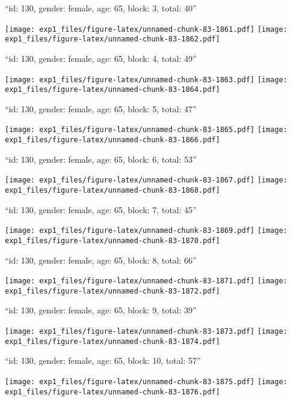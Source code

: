 \documentclass[11pt,,]{article}
\begin{document}
\newpage
[1] 

``id: 130, gender: female, age: 65, block: 3, total: 40''

\texttt{[image: exp1\_files/figure-latex/unnamed-chunk-83-1861.pdf]}
\texttt{[image: exp1\_files/figure-latex/unnamed-chunk-83-1862.pdf]}

\newpage
[1] 

``id: 130, gender: female, age: 65, block: 4, total: 49''

\texttt{[image: exp1\_files/figure-latex/unnamed-chunk-83-1863.pdf]}
\texttt{[image: exp1\_files/figure-latex/unnamed-chunk-83-1864.pdf]}

\newpage
[1] 

``id: 130, gender: female, age: 65, block: 5, total: 47''

\texttt{[image: exp1\_files/figure-latex/unnamed-chunk-83-1865.pdf]}
\texttt{[image: exp1\_files/figure-latex/unnamed-chunk-83-1866.pdf]}

\newpage
[1] 

``id: 130, gender: female, age: 65, block: 6, total: 53''

\texttt{[image: exp1\_files/figure-latex/unnamed-chunk-83-1867.pdf]}
\texttt{[image: exp1\_files/figure-latex/unnamed-chunk-83-1868.pdf]}

\newpage
[1] 

``id: 130, gender: female, age: 65, block: 7, total: 45''

\texttt{[image: exp1\_files/figure-latex/unnamed-chunk-83-1869.pdf]}
\texttt{[image: exp1\_files/figure-latex/unnamed-chunk-83-1870.pdf]}

\newpage
[1] 

``id: 130, gender: female, age: 65, block: 8, total: 66''

\texttt{[image: exp1\_files/figure-latex/unnamed-chunk-83-1871.pdf]}
\texttt{[image: exp1\_files/figure-latex/unnamed-chunk-83-1872.pdf]}

\newpage
[1] 

``id: 130, gender: female, age: 65, block: 9, total: 39''

\texttt{[image: exp1\_files/figure-latex/unnamed-chunk-83-1873.pdf]}
\texttt{[image: exp1\_files/figure-latex/unnamed-chunk-83-1874.pdf]}

\newpage
[1] 

``id: 130, gender: female, age: 65, block: 10, total: 57''

\texttt{[image: exp1\_files/figure-latex/unnamed-chunk-83-1875.pdf]}
\texttt{[image: exp1\_files/figure-latex/unnamed-chunk-83-1876.pdf]}
\end{document}
